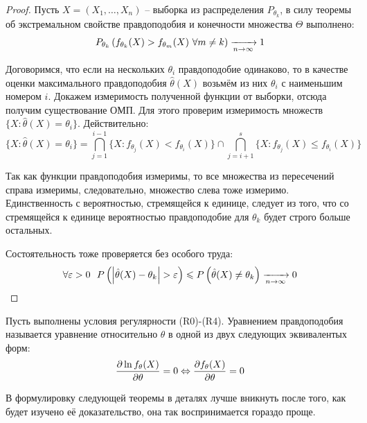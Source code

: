 \begin{proof}
    Пусть $X = (X_1, \dots, X_n)$ -- выборка из распределения $P_{\theta_k}$, в силу теоремы об экстремальном свойстве правдоподобия и конечности множества $\Theta$ выполнено:
    \[
        P_{\theta_k}\left(f_{\theta_k}(X) > f_{\theta_m}(X) \ \forall m \neq k\right) \xrightarrow[n \to \infty]{} 1
    \]

    Договоримся, что если на нескольких $\theta_i$ правдоподобие одинаково, то в качестве оценки максимального правдоподобия $\hat{\theta}(X)$ возьмём из них $\theta_i$ с наименьшим номером $i$. Докажем измеримость полученной функции от выборки, отсюда получим существование ОМП. Для этого проверим измеримость множеств $\{X \colon \hat{\theta}(X) = \theta_i\}$. Действительно:
    \[
        \{X \colon \hat{\theta}(X) = \theta_i\} = \bigcap_{j=1}^{i-1} \{X \colon f_{\theta_j}(X) < f_{\theta_i}(X)\} \cap \bigcap_{j=i+1}^s \{X \colon f_{\theta_j}(X) \le f_{\theta_i}(X)\}
    \]

    Так как функции правдоподобия измеримы, то все множества из пересечений справа измеримы, следовательно, множество слева тоже измеримо. Единственность с вероятностью, стремящейся к единице, следует из того, что со стремящейся к единице вероятностью правдоподобие для $\theta_k$ будет строго больше остальных.

    Состоятельность тоже проверяется без особого труда:
    \[
        \forall \eps > 0 \ \ P\ps{\md{\hat{\theta}(X)-\theta_k} > \eps} \le P\ps{\hat{\theta}(X) \neq \theta_k} \xrightarrow[n \to \infty]{} 0
    \]   
\end{proof}

\begin{definition}
    Пусть выполнены условия регулярности (R0)-(R4). Уравнением правдоподобия называется уравнение относительно $\theta$ в одной из двух следующих эквивалентых форм:
    \[
        \frac{\partial \ln f_\theta(X)}{\partial \theta} = 0 \Leftrightarrow \frac{\partial f_\theta(X)}{\partial \theta} = 0
    \]
\end{definition}

\begin{note}
    В формулировку следующей теоремы в деталях лучше вникнуть после того, как будет изучено её доказательство, она так воспринимается гораздо проще.
\end{note}

